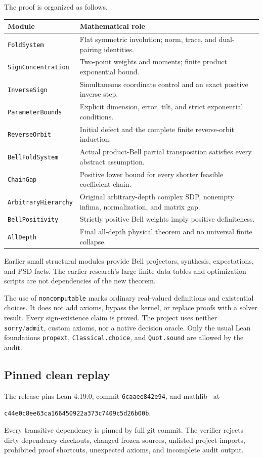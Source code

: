 \documentclass[11pt]{article}
\begin{document}
The proof is organized as follows.
\begin{center}\small
\begin{tabular}{@{}p{}p{}@{}}
\toprule
Module & Mathematical role\\\midrule
\texttt{FoldSystem} & Flat symmetric involution; norm, trace, and dual-pairing identities.\\
\texttt{SignConcentration} & Two-point weights and moments; finite product exponential bound.\\
\texttt{InverseSign} & Simultaneous coordinate control and an exact positive inverse step.\\
\texttt{ParameterBounds} & Explicit dimension, error, tilt, and strict exponential conditions.\\
\texttt{ReverseOrbit} & Initial defect and the complete finite reverse-orbit induction.\\
\texttt{BellFoldSystem} & Actual product-Bell partial transposition satisfies every abstract assumption.\\
\texttt{ChainGap} & Positive lower bound for every shorter feasible coefficient chain.\\
\texttt{ArbitraryHierarchy} & Original arbitrary-depth complex SDP, nonempty infima, normalization, and matrix gap.\\
\texttt{BellPositivity} & Strictly positive Bell weights imply positive definiteness.\\
\texttt{AllDepth} & Final all-depth physical theorem and no universal finite collapse.\\
\bottomrule
\end{tabular}
\end{center}

Earlier small structural modules provide Bell projectors, synthesis,
expectations, and PSD facts. The earlier research's large finite data tables
and optimization scripts are not dependencies of the new theorem.

The use of \texttt{noncomputable} marks ordinary real-valued definitions and
existential choices. It does not add axioms, bypass the kernel, or replace
proofs with a solver result. Every sign-existence claim is proved. The
project uses neither \texttt{sorry}/\texttt{admit}, custom axioms, nor a native
decision oracle. Only the usual Lean foundations \texttt{propext},
\texttt{Classical.choice}, and \texttt{Quot.sound} are allowed by the audit.

\subsection{Pinned clean replay}
The release pins Lean 4.19.0, commit \texttt{6caaee842e94}, and mathlib~\cite{Lean} at
\begin{center}\small\texttt{c44e0c8ee63ca166450922a373c7409c5d26b00b}.\end{center}
Every transitive dependency is pinned by full git commit. The verifier
rejects dirty dependency checkouts, changed frozen sources, unlisted project
imports, prohibited proof shortcuts, unexpected axioms, and incomplete
audit output.
\end{document}
